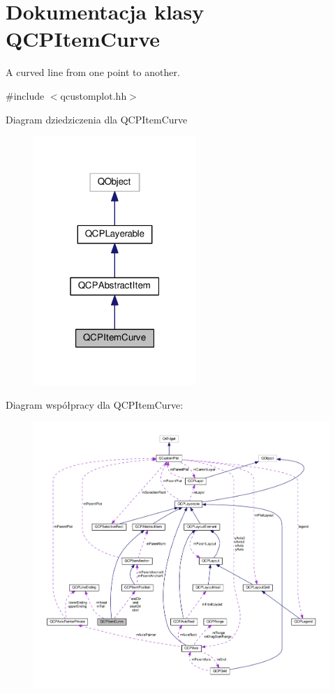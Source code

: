 \hypertarget{class_q_c_p_item_curve}{}\section{Dokumentacja klasy Q\+C\+P\+Item\+Curve}
\label{class_q_c_p_item_curve}


A curved line from one point to another.  




{\ttfamily \#include $<$qcustomplot.\+hh$>$}



Diagram dziedziczenia dla Q\+C\+P\+Item\+Curve\nopagebreak
\begin{figure}[H]
\begin{center}
\leavevmode
\includegraphics[width=175pt]{class_q_c_p_item_curve__inherit__graph}
\end{center}
\end{figure}


Diagram współpracy dla Q\+C\+P\+Item\+Curve\+:\nopagebreak
\begin{figure}[H]
\begin{center}
\leavevmode
\includegraphics[width=350pt]{class_q_c_p_item_curve__coll__graph}
\end{center}
\end{figure}
